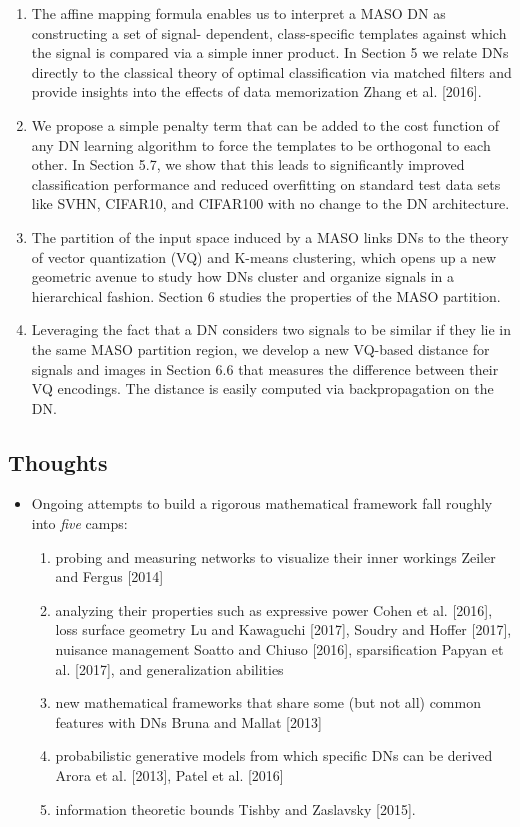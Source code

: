 \documentclass{article}
\begin{document}
\begin{enumerate}
	\item The affine mapping formula enables us to interpret a MASO DN as constructing a set of signal- dependent, class-specific templates against which the signal is compared via a simple inner product. In Section 5 we relate DNs directly to the classical theory of optimal classification via matched filters and provide insights into the effects of data memorization Zhang et al. [2016].
	\item We propose a simple penalty term that can be added to the cost function of any DN learning algorithm to force the templates to be orthogonal to each other. In Section 5.7, we show that this leads to significantly improved classification performance and reduced overfitting on standard test data sets like SVHN, CIFAR10, and CIFAR100 with no change to the DN architecture.
	\item The partition of the input space induced by a MASO links DNs to the theory of vector quantization (VQ) and K-means clustering, which opens up a new geometric avenue to study how DNs cluster and organize signals in a hierarchical fashion. Section 6 studies the properties of the MASO partition.
	\item Leveraging the fact that a DN considers two signals to be similar if they lie in the same MASO partition region, we develop a new VQ-based distance for signals and images in Section 6.6 that measures the difference between their VQ encodings. The distance is easily computed via backpropagation on the DN.
\end{enumerate}


\subsection{Thoughts}

\begin{itemize}
	\item Ongoing attempts to build a rigorous mathematical framework fall roughly into \emph{five} camps:
	\begin{enumerate}
		\item probing and measuring networks to visualize their inner workings Zeiler and Fergus [2014]
		\item analyzing their properties such as expressive power Cohen et al. [2016], loss surface geometry Lu and Kawaguchi [2017], Soudry and Hoffer [2017], nuisance management Soatto and Chiuso [2016], sparsification Papyan et al. [2017], and generalization abilities
		\item new mathematical frameworks that share some (but not all) common features with DNs Bruna and Mallat [2013]
		\item probabilistic generative models from which specific DNs can be derived Arora et al. [2013], Patel et al. [2016]
		\item information theoretic bounds Tishby and Zaslavsky [2015].
	\end{enumerate}
\end{itemize}
\end{document}
